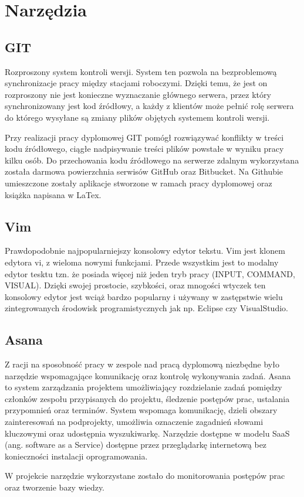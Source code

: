 \section{Narzędzia}
\label{cha:Narzędzia}

\subsection{GIT}
\label{sub:GIT}
Rozproszony system kontroli wersji. System ten pozwola na bezproblemową synchronizacje pracy między stacjami roboczymi. Dzięki temu, że jest on rozproszony nie jest konieczne wyznaczanie głównego serwera, przez który synchronizowany jest kod źródłowy, a każdy z klientów może pełnić rolę serwera do którego wysyłane są zmiany plików objętych systemem kontroli wersji.

Przy realizacji pracy dyplomowej GIT pomógł rozwiązywać konflikty w treści kodu źródłowego, ciągłe nadpisywanie treści plików powstałe w wyniku pracy kilku osób. Do przechowania kodu źródłowego na serwerze zdalnym wykorzystana została darmowa powierzchnia serwisów GitHub oraz Bitbucket. Na Githubie umieszczone zostały aplikacje stworzone w ramach pracy dyplomowej oraz książka napisana w LaTex.

\subsection{Vim}
\label{sub:Vim}
Prawdopodobnie najpopularniejszy konsolowy edytor tekstu. Vim jest klonem edytora vi, z wieloma nowymi funkcjami. Przede wszystkim jest to modalny edytor tesktu tzn. że posiada więcej niż jeden tryb pracy (INPUT, COMMAND, VISUAL). Dzięki swojej prostocie, szybkości, oraz mnogości wtyczek ten konsolowy edytor jest wciąż bardzo popularny i używany w zastępstwie wielu zintegrowanych środowisk programistycznych jak np. Eclipse czy VisualStudio.  


\subsection{Asana}
\label{sub:Asana}

Z racji na sposobność pracy w zespole nad pracą dyplomową niezbędne było narzędzie wspomagające komunikację oraz kontrolę wykonywania zadań. Asana to system zarządzania projektem umożliwiający rozdzielanie zadań pomiędzy członków zespołu przypisanych do projektu, śledzenie postępów prac, ustalania przypomnień oraz terminów. System wspomaga komunikację, dzieli obszary zainteresowań na podprojekty, umożliwia oznaczenie zagadnień słowami kluczowymi oraz udostępnia wyszukiwarkę. Narzędzie dostępne w modelu SaaS (ang. software as a Service) dostępne przez przeglądarkę internetową bez konieczności instalacji oprogramowania.

W projekcie narzędzie wykorzystane zostało do monitorowania postępów prac oraz tworzenie bazy wiedzy.
